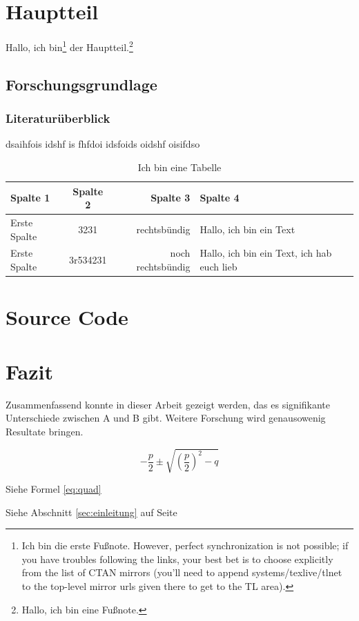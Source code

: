 \documentclass[ngerman]{scrreprt}
\begin{document}
\section{Hauptteil}

Hallo, ich bin\footnote{Ich bin die erste Fußnote. However, perfect synchronization is not possible; if you have troubles following the links, your best bet is to choose explicitly from the list of CTAN mirrors (you'll need to append systems/texlive/tlnet to the top-level mirror urls given there to get to the TL area).} der Hauptteil.\footnote{Hallo, ich bin eine Fußnote.}

\subsection{Forschungsgrundlage}

\subsubsection{Literaturüberblick}

dsaihfois idshf is fhfdoi idsfoids oidshf oisifdso

\begin{table}
\caption{Ich bin eine Tabelle}
\begin{tabular}{lcrp{5cm}}
\bfseries Spalte 1 &\bfseries  Spalte 2 &\bfseries  Spalte 3 &\bfseries  Spalte 4 \\ \hline
Erste Spalte & 3231 & rechtsbündig & Hallo, ich bin ein Text \\ \hline
Erste Spalte & 3r534231 & noch rechtsbündig & Hallo, ich bin ein Text, ich hab euch lieb \\ \hline
\end{tabular}
\end{table}

\section{Source Code}




\section{Fazit}

Zusammenfassend konnte in dieser Arbeit gezeigt werden, das es signifikante Unterschiede zwischen A und B gibt. Weitere Forschung wird genausowenig Resultate bringen.

\begin{equation}\label{eq:quad}
-\frac{p}{2} \pm \sqrt{ \left(\frac{p}{2}\right)^2  -q }
\end{equation}

Siehe Formel \ref{eq:quad}


Siehe Abschnitt \ref{sec:einleitung} auf Seite \pageref{sec:einleitung}
\end{document}
